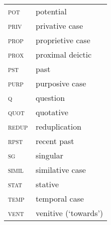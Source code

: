 \begin{tabularx}{.45\textwidth}{lQ}
    \textsc{pot} & potential\\
    \textsc{priv} & privative case\\
	\textsc{prop} & proprietive case\\
    \textsc{prox} & proximal deictic\\
    \textsc{pst} & past\\
    \textsc{purp} & purposive case\\
    \textsc{q} & question\\    
    \textsc{quot} & quotative\\
    \textsc{redup} & reduplication\\
	\textsc{rpst} & recent past\\
    \textsc{sg} & singular\\
    \textsc{simil} & similative case\\
    \textsc{stat} & stative\\
    \textsc{temp} & temporal case\\
    \textsc{vent} & venitive (`towards')\\
\end{tabularx}